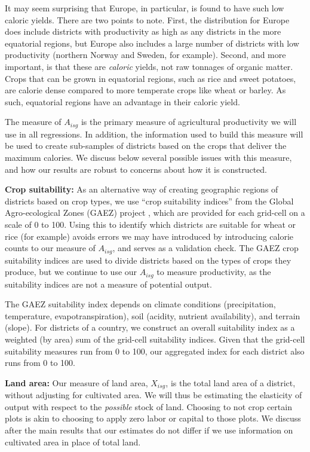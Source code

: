 \documentclass[11pt]{article}
\begin{document}
It may seem surprising that Europe, in particular, is found to have such low caloric yields. There are two points to note. First, the distribution for Europe does include districts with productivity as high as any districts in the more equatorial regions, but Europe also includes a large number of districts with low productivity (northern Norway and Sweden, for example). Second, and more important, is that these are \textit{caloric} yields, not raw tonnages of organic matter. Crops that can be grown in equatorial regions, such as rice and sweet potatoes, are calorie dense compared to more temperate crops like wheat or barley. As such, equatorial regions have an advantage in their caloric yield. 

The measure of $A_{isg}$ is the primary measure of agricultural productivity we will use in all regressions. In addition, the information used to build this measure will be used to create sub-samples of districts based on the crops that deliver the maximum calories. We discuss below several possible issues with this measure, and how our results are robust to concerns about how it is constructed.

\vspace{.5cm}\noindent\textbf{Crop suitability:} As an alternative way of creating geographic regions of districts based on crop types, we use ``crop suitability indices'' from the Global Agro-ecological Zones (GAEZ) project \citep{gaez}, which are provided for each grid-cell on a scale of 0 to 100. Using this to identify which districts are suitable for wheat or rice (for example) avoids errors we may have introduced by introducing calorie counts to our measure of $A_{isg}$, and serves as a validation check. The GAEZ crop suitability indices are used to divide districts based on the types of crops they produce, but we continue to use our $A_{isg}$ to measure productivity, as the suitability indices are not a measure of potential output.

The GAEZ suitability index depends on climate conditions (precipitation, temperature, evapotranspiration), soil (acidity, nutrient availability), and terrain (slope). For districts of a country, we construct an overall suitability index as a weighted (by area) sum of the grid-cell suitability indices. Given that the grid-cell suitability measures run from 0 to 100, our aggregated index for each district also runs from 0 to 100.

\vspace{.5cm}\noindent\textbf{Land area:} Our measure of land area, $X_{isg}$, is the total land area of a district, without adjusting for cultivated area. We will thus be estimating the elasticity of output with respect to the \textit{possible} stock of land. Choosing to not crop certain plots is akin to choosing to apply zero labor or capital to those plots. We discuss after the main results that our estimates do not differ if we use information on cultivated area in place of total land.
\end{document}
